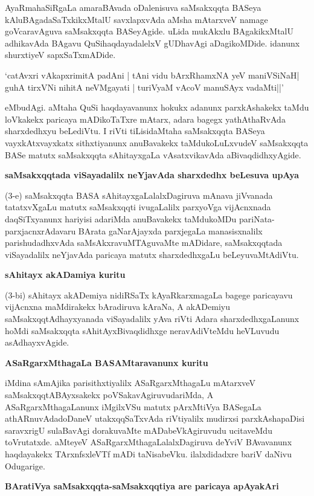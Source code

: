 AyaRmahaSiRgaLa amaraBAvada oDalenisuva saMsakxqqta BASeya kAluBAgadaSaTxkikxMtalU savxlapxvAda aMsha mAtarxveV namage goVcaravAguva saMsakxqqta BASeyAgide. uLida mukAkxlu BAgakikxMtalU adhikavAda BAgavu QuSihaqdayadalelxV gUDhavAgi aDagikoMDide. idanunx shurxtiyeV sapxSaTxmADide.
\begin{shloka}
`catAvxri vAkapxrimitA padAni | tAni vidu bArxRhamxNA yeV maniVSiNaH|\\\label{31}
guhA tirxVNi nihitA neVMgayati | turiVyaM vAcoV manuSAyx vadaMti||'
\end{shloka}
eMbudAgi. aMtaha QuSi haqdayavanunx hokukx adanunx parxkAshakekx taMdu loVkakekx paricaya mADikoTaTxre mAtarx, adara bagegx yathAthaRvAda sharxdedhxyu beLediVtu. I riVti tiLisidaMtaha saMsakxqqta BASeya vayxkAtxvayxkatx sithxtiyanunx anuBavakekx taMdukoLuLxvudeV saMsakxqqta BASe matutx saMsakxqqta sAhitayxgaLa vAsatxvikavAda aBivaqdidhxyAgide.

\noindent
\textbf{saMsakxqqtada viSayadalilx neYjavAda sharxdedhx beLesuva upAya}\label{page31}

(3-e) saMsakxqqta BASA sAhitayxgaLalalxDagiruva mAnava jiVvanada tatatxvXgaLu matutx saMsakxqqti ivugaLalilx parxyoVga vijAcnxnada daqSiTxyanunx hariyisi adariMda anuBavakekx taMdukoMDu pariNata-parxjacnxrAdavaru BArata gaNarAjayxda parxjegaLa manasisxnalilx parishudadhxvAda saMsAkxravuMTAguvaMte mADidare, saMsakxqqtada viSayadalilx neYjavAda paricaya matutx sharxdedhxgaLu beLeyuvaMtAdiVtu.

\noindent
\textbf{sAhitayx akADamiya kuritu}\label{page32}

(3-bi) sAhitayx akADemiya nidiRSaTx kAyaRkarxmagaLa bagege paricayavu vijAcnxna maMdirakekx bAradiruva kAraNa, A akADemiyu saMsakxqqtAdhayxyanada viSayadalilx yAva riVti Adara sharxdedhxgaLanunx hoMdi saMsakxqqta sAhitAyxBivaqdidhxge neravAdiVteMdu heVLuvudu asAdhayxvAgide.

\noindent
\textbf{ASaRgarxMthagaLa BASAMtaravanunx kuritu}

iMdina sAmAjika parisithxtiyalilx ASaRgarxMthagaLu mAtarxveV saMsakxqqtABAyxsakekx poVSakavAgiruvudariMda, A ASaRgarxMthagaLanunx iMgilxVSu matutx pArxMtiVya BASegaLa athARnuvAdadoDaneV utakxqqSaTxvAda riVtiyalilx mudirxsi parxkAshapaDisi saravxrigU sulaBavAgi dorakuvaMte mADabeVkAgiruvudu ucitaveMdu toVrutatxde. aMteyeV ASaRgarxMthagaLalalxDagiruva deYviV BAvavanunx haqdayakekx TArxnfsxleVTf mADi taNisabeVku. ilalxdidadxre bariV daNivu Odugarige. 

\noindent
\textbf{BAratiVya saMsakxqqta-saMsakxqqtiya are paricaya apAyakAri}\label{page32}

